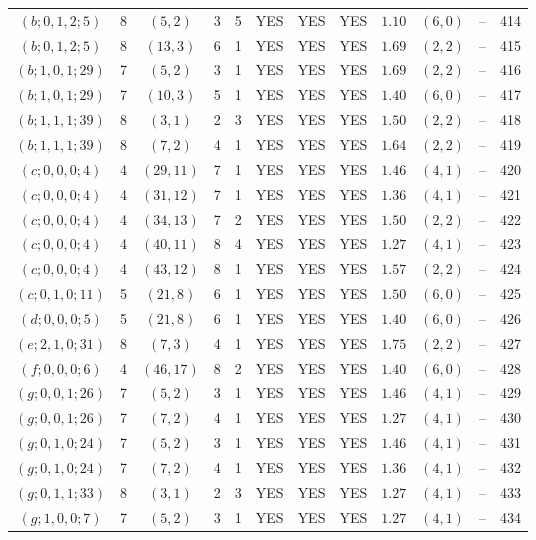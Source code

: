 \begin{longtable}{|c|c|c|c|c|c|c|c|c|c|c|c|}
$(b;0,1,2;5)$ & 8 & $(5,2)$ & 3 & 5 & YES & YES & YES & $1.10$ & $(6,0)$ & -- & 414\\
$(b;0,1,2;5)$ & 8 & $(13,3)$ & 6 & 1 & YES & YES & YES & $1.69$ & $(2,2)$ & -- & 415\\
$(b;1,0,1;29)$ & 7 & $(5,2)$ & 3 & 1 & YES & YES & YES & $1.69$ & $(2,2)$ & -- & 416\\
$(b;1,0,1;29)$ & 7 & $(10,3)$ & 5 & 1 & YES & YES & YES & $1.40$ & $(6,0)$ & -- & 417\\
$(b;1,1,1;39)$ & 8 & $(3,1)$ & 2 & 3 & YES & YES & YES & $1.50$ & $(2,2)$ & -- & 418\\
$(b;1,1,1;39)$ & 8 & $(7,2)$ & 4 & 1 & YES & YES & YES & $1.64$ & $(2,2)$ & -- & 419\\
$(c;0,0,0;4)$ & 4 & $(29,11)$ & 7 & 1 & YES & YES & YES & $1.46$ & $(4,1)$ & -- & 420\\
$(c;0,0,0;4)$ & 4 & $(31,12)$ & 7 & 1 & YES & YES & YES & $1.36$ & $(4,1)$ & -- & 421\\
$(c;0,0,0;4)$ & 4 & $(34,13)$ & 7 & 2 & YES & YES & YES & $1.50$ & $(2,2)$ & -- & 422\\
$(c;0,0,0;4)$ & 4 & $(40,11)$ & 8 & 4 & YES & YES & YES & $1.27$ & $(4,1)$ & -- & 423\\
$(c;0,0,0;4)$ & 4 & $(43,12)$ & 8 & 1 & YES & YES & YES & $1.57$ & $(2,2)$ & -- & 424\\
$(c;0,1,0;11)$ & 5 & $(21,8)$ & 6 & 1 & YES & YES & YES & $1.50$ & $(6,0)$ & -- & 425\\
$(d;0,0,0;5)$ & 5 & $(21,8)$ & 6 & 1 & YES & YES & YES & $1.40$ & $(6,0)$ & -- & 426\\
$(e;2,1,0;31)$ & 8 & $(7,3)$ & 4 & 1 & YES & YES & YES & $1.75$ & $(2,2)$ & -- & 427\\
$(f;0,0,0;6)$ & 4 & $(46,17)$ & 8 & 2 & YES & YES & YES & $1.40$ & $(6,0)$ & -- & 428\\
$(g;0,0,1;26)$ & 7 & $(5,2)$ & 3 & 1 & YES & YES & YES & $1.46$ & $(4,1)$ & -- & 429\\
$(g;0,0,1;26)$ & 7 & $(7,2)$ & 4 & 1 & YES & YES & YES & $1.27$ & $(4,1)$ & -- & 430\\
$(g;0,1,0;24)$ & 7 & $(5,2)$ & 3 & 1 & YES & YES & YES & $1.46$ & $(4,1)$ & -- & 431\\
$(g;0,1,0;24)$ & 7 & $(7,2)$ & 4 & 1 & YES & YES & YES & $1.36$ & $(4,1)$ & -- & 432\\
$(g;0,1,1;33)$ & 8 & $(3,1)$ & 2 & 3 & YES & YES & YES & $1.27$ & $(4,1)$ & -- & 433\\
$(g;1,0,0;7)$ & 7 & $(5,2)$ & 3 & 1 & YES & YES & YES & $1.27$ & $(4,1)$ & -- & 434\\

\end{longtable}
